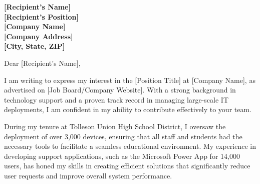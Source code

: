 

\geometry{
  left=2cm,
  right=2cm,
  top=2cm,
  bottom=2cm,
  portrait
}



\begin{minipage}[t]{0.45\textwidth}
\end{minipage}
\hfill
\begin{minipage}[t]{0.45\textwidth}
  \vspace{0pt} %
  \date{\today}
\end{minipage}

\vspace{1cm} 

\textbf{[Recipient's Name]} \\
\textbf{[Recipient's Position]} \\
\textbf{[Company Name]} \\
\textbf{[Company Address]} \\
\textbf{[City, State, ZIP]}

\vspace{0.5cm}

\noindent Dear [Recipient's Name],

\vspace{0.5cm}

\justifying
I am writing to express my interest in the [Position Title] at [Company Name], as advertised on [Job Board/Company Website]. With a strong background in technology support and a proven track record in managing large-scale IT deployments, I am confident in my ability to contribute effectively to your team.

During my tenure at Tolleson Union High School District, I oversaw the deployment of over 3,000 devices, ensuring that all staff and students had the necessary tools to facilitate a seamless educational environment. My experience in developing support applications, such as the Microsoft Power App for 14,000 users, has honed my skills in creating efficient solutions that significantly reduce user requests and improve overall system performance.

